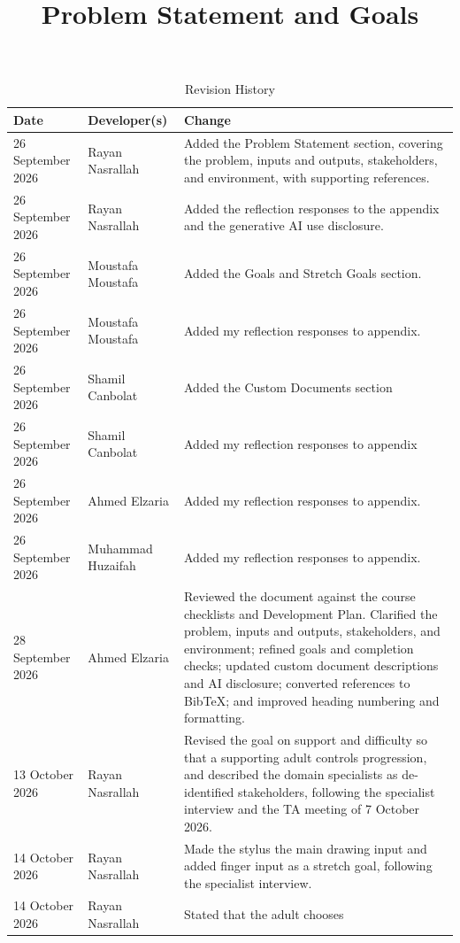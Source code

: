 \documentclass{article}
\title{Problem Statement and Goals\\\progname}
\author{\authname}
\date{}
\begin{document}
\maketitle

\begin{table}[hp]
\caption{Revision History} \label{TblRevisionHistory}
\begin{tabularx}{\textwidth}{llX}
\toprule
\textbf{Date} & \textbf{Developer(s)} & \textbf{Change}\\
\midrule
26 September 2026 & Rayan Nasrallah & Added the Problem Statement section,
covering the problem, inputs and outputs, stakeholders, and environment, with
supporting references.\\
26 September 2026 & Rayan Nasrallah & Added the reflection responses to the
appendix and the generative AI use disclosure.\\
26 September 2026 & Moustafa Moustafa & Added the Goals and Stretch Goals section.\\
26 September 2026 & Moustafa Moustafa & Added my reflection responses to appendix.\\
26 September 2026 & Shamil Canbolat & Added the Custom Documents section \\
26 September 2026 & Shamil Canbolat & Added my reflection responses to appendix \\
26 September 2026 & Ahmed Elzaria & Added my reflection responses to appendix.\\
26 September 2026 & Muhammad Huzaifah & Added my reflection responses to appendix.\\
28 September 2026 & Ahmed Elzaria &
Reviewed the document against the course checklists and Development
Plan. Clarified the problem, inputs and outputs, stakeholders, and
environment; refined goals and completion checks; updated custom
document descriptions and AI disclosure; converted references to
BibTeX; and improved heading numbering and formatting. \\
13 October 2026 & Rayan Nasrallah & Revised the goal on support and
difficulty so that a supporting adult controls progression, and described
the domain specialists as de-identified stakeholders, following
the specialist interview and the TA meeting of 7 October 2026.\\
14 October 2026 & Rayan Nasrallah & Made the stylus the main drawing
input and added finger input as a stretch goal, following the specialist
interview.\\
14 October 2026 & Rayan Nasrallah & Stated that the adult chooses

\end{tabularx}
\end{table}
\end{document}
